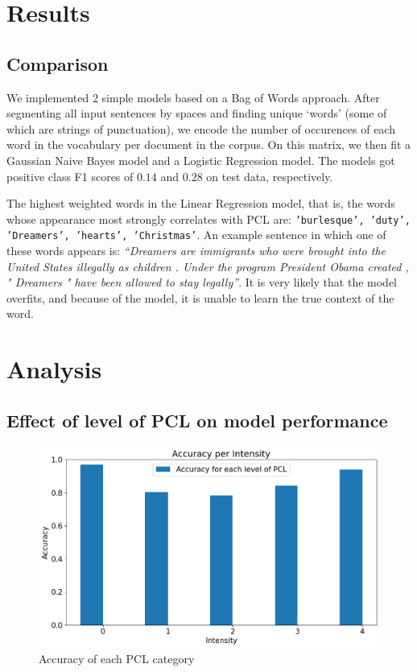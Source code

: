 \documentclass[11pt,a4paper]{article}
\begin{document}
\section{Results}

\subsection{Comparison}

We implemented 2 simple models based on a Bag of Words approach. After segmenting all input sentences by spaces and finding unique `words' (some of which are strings of punctuation), we encode the number of occurences of each word in the vocabulary per document in the corpus. On this matrix, we then fit a Gaussian Naive Bayes model and a Logistic Regression model. The models got positive class F1 scores of $0.14$ and $0.28$ on test data, respectively.

The highest weighted words in the Linear Regression model, that is, the words whose appearance most strongly correlates with PCL are: \texttt{'burlesque', 'duty', 'Dreamers', 'hearts', 'Christmas'}. An example sentence in which one of these words appears is: \emph{``Dreamers are immigrants who were brought into the United States illegally as children . Under the program President Obama created , " Dreamers " have been allowed to stay legally''}. It is very likely that the model overfits, and because of the model, it is unable to learn the true context of the word.

\section{Analysis}

\subsection*{Effect of level of PCL on model performance}

\begin{figure}[H]
    \centering
    \includegraphics[width=\linewidth]{figures/accuracy_per_pecl_lebl.png}
    \caption{Accuracy of each PCL category}
    \label{fig:accuracy-per-pcl-cateogry}
\end{figure}
\end{document}
